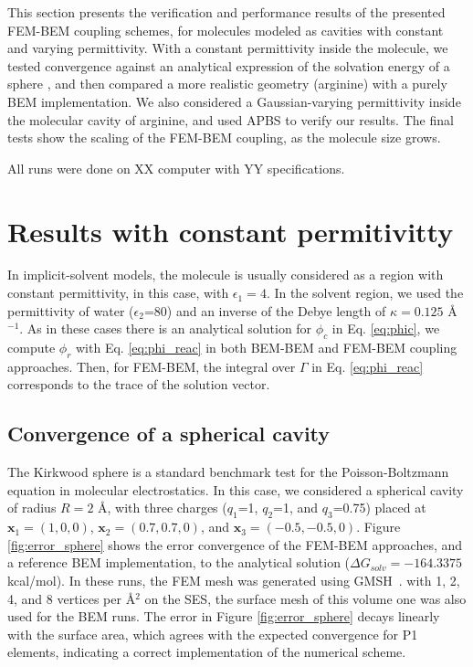 This section presents the verification and performance results of the presented FEM-BEM coupling schemes, for molecules modeled as cavities with constant and varying permittivity.
With a constant permittivity inside the molecule, we tested convergence against an analytical expression of the solvation energy of a sphere \cite{Kirkwood1934}, and then compared a more realistic geometry (arginine) with a purely BEM implementation.
We also considered a Gaussian-varying permittivity\cite{grant2001smooth,li2013dielectric} inside the molecular cavity of arginine, and used APBS \cite{BakerETal2001} to verify our results.
The final tests show the scaling of the FEM-BEM coupling, as the molecule size grows. 

All runs were done on XX computer with YY specifications. 

\section*{\sffamily \Large Results with constant permitivitty}

In implicit-solvent models, the molecule is usually considered as a region with constant permittivity, in this case, with $\epsilon_1=4$.
In the solvent region, we used the permittivity of water ($\epsilon_2$=80) and an inverse of the Debye length of $\kappa=0.125$ \AA$^{-1}$.
As in these cases there is an analytical solution for $\phi_c$ in Eq. \eqref{eq:phic}, we compute $\phi_r$ with Eq. \eqref{eq:phi_reac} in both BEM-BEM and FEM-BEM coupling approaches. Then, for FEM-BEM, the integral over $\Gamma$ in Eq. \eqref{eq:phi_reac} corresponds to the trace of the solution vector.

\subsection*{\sffamily \large Convergence of a spherical cavity}

The Kirkwood sphere \cite{Kirkwood1934} is a standard benchmark test for the Poisson-Boltzmann equation in molecular electrostatics. 
In this case, we considered a spherical cavity of radius $R=2$ \AA, with three charges ($q_1$=1, $q_2$=1, and $q_3$=0.75) placed at $\mathbf{x}_1=(1,0,0)$, $\mathbf{x}_2=(0.7,0.7,0)$, and $\mathbf{x}_3=(-0.5,-0.5,0)$.
Figure \ref{fig:error_sphere} shows the error convergence of the FEM-BEM approaches, and a reference BEM implementation, to the analytical solution ($\Delta G_{solv}= -164.3375$ kcal/mol). 
In these runs, the FEM mesh was generated using GMSH~\cite{geuzaine2009gmsh}. 
with 1, 2, 4, and 8 vertices per \AA$^2$ on the SES, the surface mesh of this volume one was also used for the BEM runs. 
The error in Figure \ref{fig:error_sphere} decays linearly with the surface area, which agrees with the expected convergence for P1 elements, indicating a correct implementation of the numerical scheme. 

